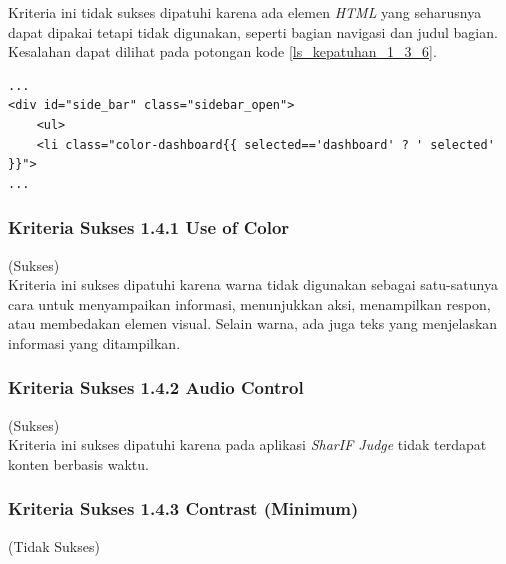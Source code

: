\documentclass[a4paper,twoside]{article}
\begin{document}
\begin{enumerate}
		Kriteria ini tidak sukses dipatuhi karena ada elemen \textit{HTML} yang seharusnya dapat dipakai tetapi tidak digunakan, seperti bagian navigasi dan judul bagian. Kesalahan dapat dilihat pada potongan kode \ref{ls_kepatuhan_1_3_6}.
		\begin{lstlisting}[basicstyle=\ttfamily, frame=single,
		columns=fullflexible, keepspaces=true, breaklines=true, label=ls_kepatuhan_1_3_6, caption=Kriteria Sukses 1.3.6 - \textit{Sidebar}]
...
<div id="side_bar" class="sidebar_open">
	<ul>
	<li class="color-dashboard{{ selected=='dashboard' ? ' selected' }}">
...
		\end{lstlisting}
		
		\subsubsection*{Kriteria Sukses 1.4.1 Use of Color}
		\label{subsubsec:kepatuhan_kriteria_1.4.1}
		(Sukses) \\
		
		Kriteria ini sukses dipatuhi karena warna tidak digunakan sebagai satu-satunya cara untuk menyampaikan informasi, menunjukkan aksi, menampilkan respon, atau membedakan elemen visual. Selain warna, ada juga teks yang menjelaskan informasi yang ditampilkan.
		
		\subsubsection*{Kriteria Sukses 1.4.2 Audio Control}
		\label{subsubsec:kepatuhan_kriteria_1.4.2}
		(Sukses) \\
		
		Kriteria ini sukses dipatuhi karena pada aplikasi \textit{SharIF Judge} tidak terdapat konten berbasis waktu.
		
		\subsubsection*{Kriteria Sukses 1.4.3 Contrast (Minimum)}
		\label{subsubsec:kepatuhan_kriteria_1.4.3}
		(Tidak Sukses) \\
		

\end{enumerate}
\end{document}
